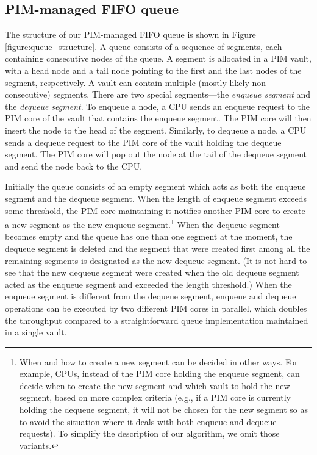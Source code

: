 \documentclass[11pt]{article}
\begin{document}
\subsection{PIM-managed FIFO queue}
The structure of our PIM-managed FIFO queue is shown in Figure \ref{figure:queue_structure}.
A queue consists of a sequence of segments, each containing consecutive nodes of the queue.
A segment is allocated in a PIM vault, with a head node and a tail node pointing to the first 
and the last nodes of the segment, respectively.
A vault can contain multiple (mostly likely non-consecutive) segments. 
There are two special segments---the \emph{enqueue segment} and the \emph{dequeue segment}.
To enqueue a node, a CPU sends an enqueue request to the PIM core of the vault
that contains the enqueue segment.
The PIM core will then insert the node to the head of the segment.
Similarly, to dequeue a node, a CPU sends a dequeue request to the PIM core of the vault
holding the dequeue segment. 
The PIM core will pop out the node at the tail of the dequeue segment and 
send the node back to the CPU.

Initially the queue consists of an empty segment which acts as both the enqueue segment and 
the dequeue segment. 
When the length of enqueue segment exceeds some threshold, the PIM core maintaining it
notifies another PIM core to create a new segment as the new enqueue segment.\footnote{
When and how to create a new segment can be decided in other ways.
For example, CPUs, instead of the PIM core holding the enqueue segment, 
can decide when to create the new segment and which vault to hold the new segment, 
based on more complex criteria 
(e.g., if a PIM core is currently holding the dequeue segment, it will not be chosen for 
the new segment so as to avoid the situation where it deals with both enqueue and dequeue requests).
To simplify the description of our algorithm, we omit those variants.}
When the dequeue segment becomes empty and the queue has one than one segment at the moment, 
the dequeue segment is deleted and the segment that were created first 
among all the remaining segments is designated as the new dequeue segment. 
(It is not hard to see that the new dequeue segment were created when the old dequeue segment 
acted as the enqueue segment and exceeded the length threshold.)
When the enqueue segment is different from the dequeue segment, 
enqueue and dequeue operations can be executed by two different PIM cores 
in parallel, which doubles the throughput compared to a straightforward queue implementation 
maintained in a single vault.  
\end{document}
